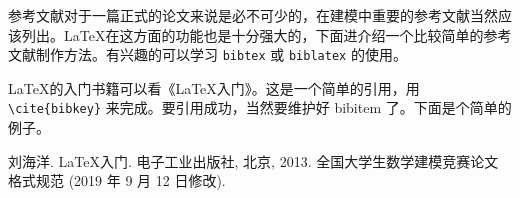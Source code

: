 \documentclass{cumcmthesis}
\begin{document}
参考文献对于一篇正式的论文来说是必不可少的，在建模中重要的参考文献当然应该列出。\LaTeX{}在这方面的功能也是十分强大的，下面进介绍一个比较简单的参考文献制作方法。有兴趣的可以学习 \verb|bibtex| 或 \verb|biblatex| 的使用。

\LaTeX{}的入门书籍可以看《\LaTeX{}入门》\cite{liuhaiyang2013latex}。这是一个简单的引用，用 \verb|\cite{bibkey}| 来完成。要引用成功，当然要维护好 bibitem 了。下面是个简单的例子。

\newpage

\begin{thebibliography}{9}%
    刘海洋.
    \newblock \LaTeX {}入门\allowbreak[J].
    \newblock 电子工业出版社, 北京, 2013.
    全国大学生数学建模竞赛论文格式规范 (2019 年 9 月 12 日修改).
\end{thebibliography}
\end{document}
